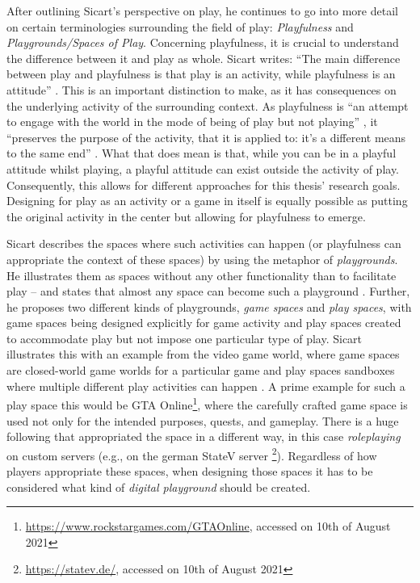 After outlining Sicart's perspective on play, he continues to go into more detail on certain terminologies surrounding the field of play: \textit{Playfulness} and \textit{Playgrounds/Spaces of Play}. Concerning playfulness, it is crucial to understand the difference between it and play as whole. Sicart writes: \enquote{The main difference between play and playfulness is that play is an activity, while playfulness is an attitude} \cite[p. 22]{sicart2014play}. This is an important distinction to make, as it has consequences on the underlying activity of the surrounding context. As playfulness is \enquote{an attempt to engage with the world in the mode of being of play but not playing} \cite[p. 22]{sicart2014play}, it \enquote{preserves the purpose of the activity, that it is applied to: it's a different means to the same end} \cite[p. 26]{sicart2014play}. What that does mean is that, while you can be in a playful attitude whilst playing, a playful attitude can exist outside the activity of play. Consequently, this allows for different approaches for this thesis' research goals. Designing for play as an activity or a game in itself is equally possible as putting the original activity in the center but allowing for playfulness to emerge.

Sicart describes the spaces where such activities can happen (or playfulness can appropriate the context of these spaces) by using the metaphor of \textit{playgrounds}. He illustrates them as spaces without any other functionality than to facilitate play -- and states that almost any space can become such a playground \cite[p. 7]{sicart2014play}. Further, he proposes two different kinds of playgrounds, \textit{game spaces} and \textit{play spaces}, with game spaces being designed explicitly for game activity and play spaces created to accommodate play but not impose one particular type of play. Sicart illustrates this with an example from the video game world, where game spaces are closed-world game worlds for a particular game and play spaces sandboxes where multiple different play activities can happen \cite[p. 51]{sicart2014play}. A prime example for such a play space this would be GTA Online\footnote{\url{https://www.rockstargames.com/GTAOnline}, accessed on 10th of August 2021}, where the carefully crafted game space is used not only for the intended purposes, quests, and gameplay. There is a huge following that appropriated the space in a different way, in this case \textit{roleplaying} on custom servers (e.g., on the german StateV server \footnote{\url{https://statev.de/}, accessed on 10th of August 2021}). Regardless of how players appropriate these spaces, when designing those spaces it has to be considered what kind of \textit{digital playground} should be created.

